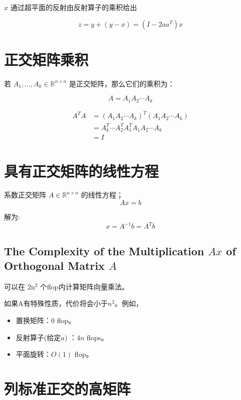 \begin{corollary}
    $ x $ 通过超平面的反射由反射算子的乘积给出

    $$ z=y+(y-x)=\left(I-2 a a^{T}\right) x $$
\end{corollary}

\section{正交矩阵乘积}

若 $ A_{1}, \ldots, A_{k} \in \mathbb{R}^{n \times n} $ 是正交矩阵，那么它们的乘积为：

$$ A=A_{1} A_{2} \cdots A_{k} $$

\begin{corollary}[正交矩阵乘积的正交性]

$$\begin{aligned}
    A^{T} A&=\left(A_{1} A_{2} \cdots A_{k}\right)^{T}\left(A_{1} A_{2} \cdots A_{k}\right)\\
    &=A_{k}^{T} \cdots A_{2}^{T} A_{1}^{T} A_{1} A_{2} \cdots A_{k}\\
    &=I
\end{aligned}$$

\end{corollary}


\section{具有正交矩阵的线性方程}

系数正交矩阵 $ A \in \mathbb{R}^{n \times n} $ 的线性方程；
$$
A x=b
$$

解为:
$$
x=A^{-1} b=A^{T} b
$$


\subsection{The Complexity of the Multiplication $Ax$ of Orthogonal Matrix $A$}
可以在 $ 2 \mathrm{n}^{2} $ 个flop内计算矩阵向量乘法。 

如果A有特殊性质，代价将会小于$n^2$。例如，

\begin{itemize}
    \item 置换矩阵：$0$ flop。
    \item 反射算子(给定$a$) ：$4n$ flops。
    \item 平面旋转：$O(1)$ flop。
\end{itemize}

\section{列标准正交的高矩阵}

